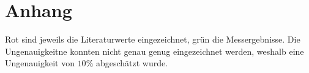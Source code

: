\chapter{Anhang}
\label{ch:Anhang}

Rot sind jeweils die Literaturwerte eingezeichnet, grün die Messergebnisse. Die Ungenauigkeitne konnten nicht genau genug eingezeichnet werden, weshalb eine Ungenauigkeit von $10\%$ abgeschätzt wurde.


